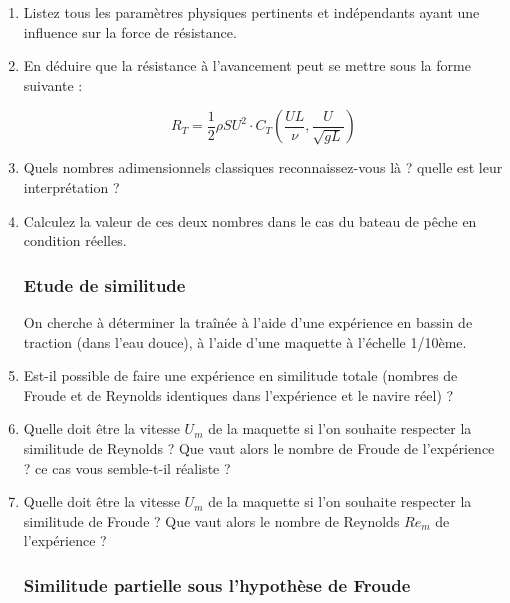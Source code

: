 \begin{enumerate}

\item Listez tous les paramètres physiques pertinents et indépendants ayant une influence sur la force de résistance.

\item En déduire que la résistance à l'avancement peut se mettre sous la forme suivante :

$$ 
R_T = \frac{1}{2} \rho S U^2 \cdot  C_T \left( \frac{U L}{\nu} , \frac{U}{\sqrt{gL}} \right) 
$$  

\item Quels nombres adimensionnels classiques reconnaissez-vous là ? quelle est leur interprétation ?

\item Calculez la valeur de ces deux nombres dans le cas du bateau de pêche en condition réelles.



\subsubsection{Etude de similitude}

On cherche à déterminer la traînée à l'aide d'une expérience en bassin de traction (dans l'eau douce), à l'aide d'une maquette à l'échelle 1/10ème.

\item Est-il possible de faire une expérience en similitude totale (nombres de Froude et de Reynolds identiques dans l'expérience et le navire réel) ? 

\item Quelle doit être la vitesse $U_m$ de la maquette si l'on souhaite respecter la similitude de Reynolds ? Que vaut alors le nombre de Froude de l'expérience ? ce cas vous semble-t-il réaliste ?

\item Quelle doit être la vitesse $U_m$ de la maquette si l'on souhaite respecter la similitude de Froude ? Que vaut alors le nombre de Reynolds $Re_m$ de l'expérience ?


\subsubsection{Similitude partielle sous l'hypothèse de Froude} 


\end{enumerate}
